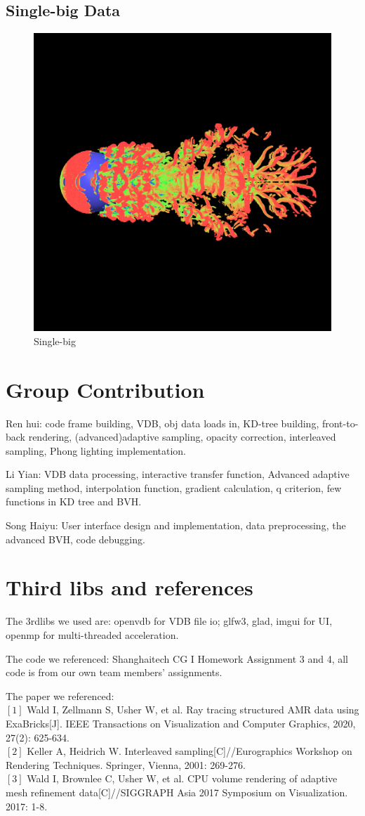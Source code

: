 \documentclass[acmtog]{acmart}
\begin{document}
\subsection{Single-big Data}


\begin{figure}[H]
	\centering
	\includegraphics[width = 0.68\linewidth]{images/result_single_big.png}
	\caption{Single-big}
\end{figure}


\section{Group Contribution}


Ren hui: code frame building, VDB, obj data loads in, KD-tree building, front-to-back rendering, (advanced)adaptive sampling, opacity correction, interleaved sampling, Phong lighting implementation.


Li Yian: VDB data processing, interactive transfer function, Advanced adaptive sampling method, interpolation function, gradient calculation, q criterion, few functions in KD tree and BVH.


Song Haiyu: User interface design and implementation, data preprocessing, the advanced BVH, code debugging.


\section{Third libs and references}


The 3rdlibs we used are: openvdb for VDB file io; glfw3, glad, imgui for UI, openmp for multi-threaded acceleration.


The code we referenced: Shanghaitech CG I Homework Assignment 3 and 4, all code is from our own team members' assignments.


The paper we referenced: \\
$[1]$ Wald I, Zellmann S, Usher W, et al. Ray tracing structured AMR data using ExaBricks[J]. IEEE Transactions on Visualization and Computer Graphics, 2020, 27(2): 625-634.\\
$[2]$ Keller A, Heidrich W. Interleaved sampling[C]//Eurographics Workshop on Rendering Techniques. Springer, Vienna, 2001: 269-276.\\
$[3]$ Wald I, Brownlee C, Usher W, et al. CPU volume rendering of adaptive mesh refinement data[C]//SIGGRAPH Asia 2017 Symposium on Visualization. 2017: 1-8.
\end{document}
